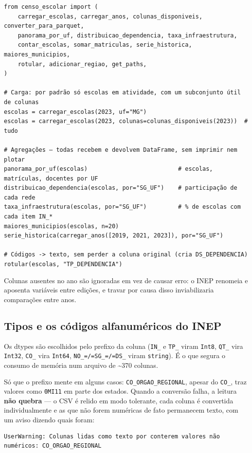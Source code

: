 \documentclass[11pt]{article}
\begin{document}
\begin{verbatim}
from censo_escolar import (
    carregar_escolas, carregar_anos, colunas_disponiveis, converter_para_parquet,
    panorama_por_uf, distribuicao_dependencia, taxa_infraestrutura,
    contar_escolas, somar_matriculas, serie_historica, maiores_municipios,
    rotular, adicionar_regiao, get_paths,
)

# Carga: por padrão só escolas em atividade, com um subconjunto útil de colunas
escolas = carregar_escolas(2023, uf="MG")
escolas = carregar_escolas(2023, colunas=colunas_disponiveis(2023))  # tudo

# Agregações — todas recebem e devolvem DataFrame, sem imprimir nem plotar
panorama_por_uf(escolas)                          # escolas, matrículas, docentes por UF
distribuicao_dependencia(escolas, por="SG_UF")    # participação de cada rede
taxa_infraestrutura(escolas, por="SG_UF")         # % de escolas com cada item IN_*
maiores_municipios(escolas, n=20)
serie_historica(carregar_anos([2019, 2021, 2023]), por="SG_UF")

# Códigos -> texto, sem perder a coluna original (cria DS_DEPENDENCIA)
rotular(escolas, "TP_DEPENDENCIA")
\end{verbatim}

Colunas ausentes no ano são ignoradas em vez de causar erro: o INEP renomeia e
aposenta variáveis entre edições, e travar por causa disso inviabilizaria
comparações entre anos.
\subsection*{Tipos e os códigos alfanuméricos do INEP}
\label{sec:org7896f9e}

Os dtypes são escolhidos pelo prefixo da coluna (\texttt{IN\_} e \texttt{TP\_} viram \texttt{Int8},
\texttt{QT\_} vira \texttt{Int32}, \texttt{CO\_} vira \texttt{Int64}, \texttt{NO\_=/=SG\_=/=DS\_} viram \texttt{string}). É o
que segura o consumo de memória num arquivo de \textasciitilde{}370 colunas.

Só que o prefixo mente em alguns casos: \texttt{CO\_ORGAO\_REGIONAL}, apesar do \texttt{CO\_},
traz valores como \texttt{0MI11} em parte dos estados. Quando a conversão falha, a
leitura \textbf{não quebra} — o CSV é relido em modo tolerante, cada coluna é
convertida individualmente e as que não forem numéricas de fato permanecem
texto, com um aviso dizendo quais foram:

\begin{verbatim}
UserWarning: Colunas lidas como texto por conterem valores não numéricos: CO_ORGAO_REGIONAL
\end{verbatim}
\end{document}
